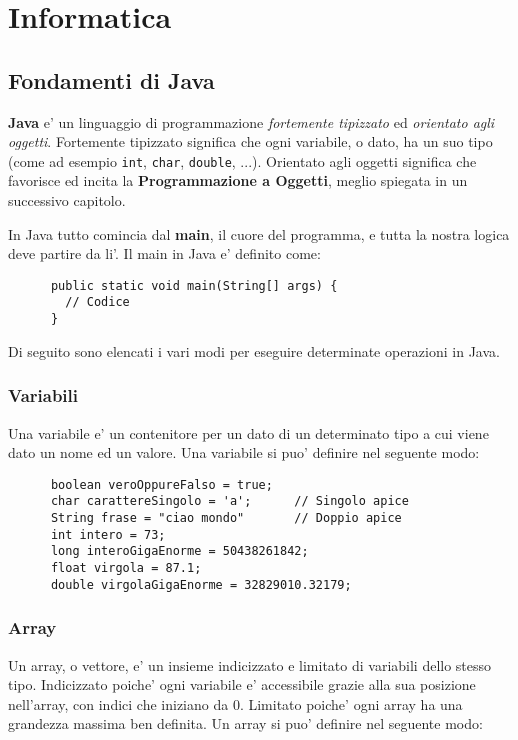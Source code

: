 \documentclass{article}
\begin{document}
  \newpage
  \tableofcontents
  \newpage

  \section{Informatica}
  {
    \subsection{Fondamenti di Java}
    \textbf{Java} e' un linguaggio di programmazione \textit{fortemente tipizzato} ed \textit{orientato agli oggetti}. Fortemente tipizzato significa che ogni variabile, o dato, ha un suo tipo \small{(come ad esempio \texttt{int}, \texttt{char}, \texttt{double}, ...)}. Orientato agli oggetti significa che favorisce ed incita la \textbf{Programmazione a Oggetti}, meglio spiegata in un successivo capitolo.

    In Java tutto comincia dal \textbf{main}, il cuore del programma, e tutta la nostra logica deve partire da li'. Il main in Java e' definito come:

    \begin{verbatim}
      public static void main(String[] args) {
        // Codice
      }
    \end{verbatim}

    Di seguito sono elencati i vari modi per eseguire determinate operazioni in Java.

    \subsubsection{Variabili} %
    Una variabile e' un contenitore per un dato di un determinato tipo a cui viene dato un nome ed un valore. Una variabile si puo' definire nel seguente modo:

    \begin{verbatim}
      boolean veroOppureFalso = true;
      char carattereSingolo = 'a';      // Singolo apice
      String frase = "ciao mondo"       // Doppio apice
      int intero = 73;
      long interoGigaEnorme = 50438261842;
      float virgola = 87.1;
      double virgolaGigaEnorme = 32829010.32179;
    \end{verbatim}

    \subsubsection{Array} %
    Un array, o vettore, e' un insieme indicizzato e limitato di variabili dello stesso tipo. Indicizzato poiche' ogni variabile e' accessibile grazie alla sua posizione nell'array, con indici che iniziano da 0. Limitato poiche' ogni array ha una grandezza massima ben definita. Un array si puo' definire nel seguente modo:

}
\end{document}
